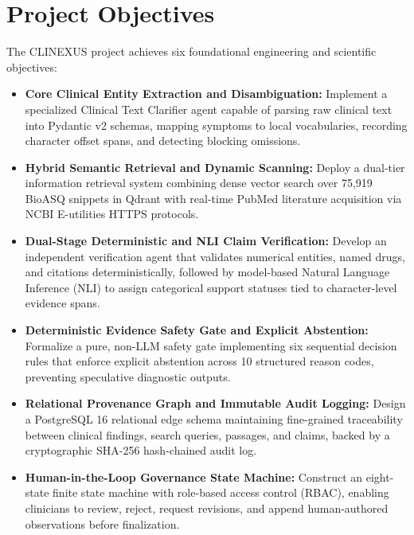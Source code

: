 \documentclass[12pt,a4paper]{report}
\begin{document}
\section{Project Objectives}
The CLINEXUS project achieves six foundational engineering and scientific objectives:
\begin{itemize}
    \item[\textbf{O1.}] \textbf{Core Clinical Entity Extraction and Disambiguation:} Implement a specialized Clinical Text Clarifier agent capable of parsing raw clinical text into Pydantic v2 schemas, mapping symptoms to local vocabularies, recording character offset spans, and detecting blocking omissions.
    \item[\textbf{O2.}] \textbf{Hybrid Semantic Retrieval and Dynamic Scanning:} Deploy a dual-tier information retrieval system combining dense vector search over 75,919 BioASQ snippets in Qdrant with real-time PubMed literature acquisition via NCBI E-utilities HTTPS protocols.
    \item[\textbf{O3.}] \textbf{Dual-Stage Deterministic and NLI Claim Verification:} Develop an independent verification agent that validates numerical entities, named drugs, and citations deterministically, followed by model-based Natural Language Inference (NLI) to assign categorical support statuses tied to character-level evidence spans.
    \item[\textbf{O4.}] \textbf{Deterministic Evidence Safety Gate and Explicit Abstention:} Formalize a pure, non-LLM safety gate implementing six sequential decision rules that enforce explicit abstention across 10 structured reason codes, preventing speculative diagnostic outputs.
    \item[\textbf{O5.}] \textbf{Relational Provenance Graph and Immutable Audit Logging:} Design a PostgreSQL 16 relational edge schema maintaining fine-grained traceability between clinical findings, search queries, passages, and claims, backed by a cryptographic SHA-256 hash-chained audit log.
    \item[\textbf{O6.}] \textbf{Human-in-the-Loop Governance State Machine:} Construct an eight-state finite state machine with role-based access control (RBAC), enabling clinicians to review, reject, request revisions, and append human-authored observations before finalization.
\end{itemize}
\end{document}
